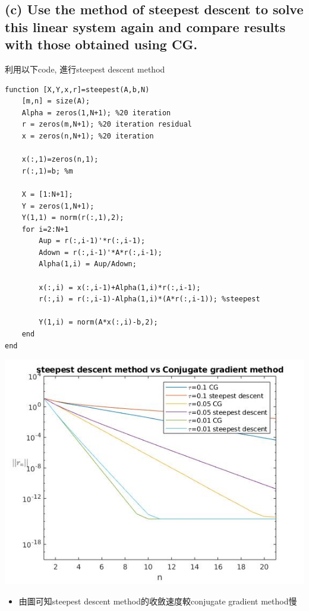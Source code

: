 \documentclass[12pt]{article}
\begin{document}
\subsection{(c) Use the method of steepest descent to solve this linear system again and
compare results with those obtained using CG.}
利用以下code, 進行steepest descent method
\begin{lstlisting}
function [X,Y,x,r]=steepest(A,b,N)
    [m,n] = size(A);
    Alpha = zeros(1,N+1); %20 iteration
    r = zeros(m,N+1); %20 iteration residual
    x = zeros(n,N+1); %20 iteration

    x(:,1)=zeros(n,1);
    r(:,1)=b; %m

    X = [1:N+1];
    Y = zeros(1,N+1);
    Y(1,1) = norm(r(:,1),2);
    for i=2:N+1
        Aup = r(:,i-1)'*r(:,i-1);
        Adown = r(:,i-1)'*A*r(:,i-1);
        Alpha(1,i) = Aup/Adown;
        
        x(:,i) = x(:,i-1)+Alpha(1,i)*r(:,i-1);
        r(:,i) = r(:,i-1)-Alpha(1,i)*(A*r(:,i-1)); %steepest

        Y(1,i) = norm(A*x(:,i)-b,2);
    end
end    
\end{lstlisting}
\includegraphics[scale=1]{3.jpg}
\begin{itemize}
    \item 由圖可知steepest descent method的收斂速度較conjugate gradient method慢
\end{itemize}
\end{document}
